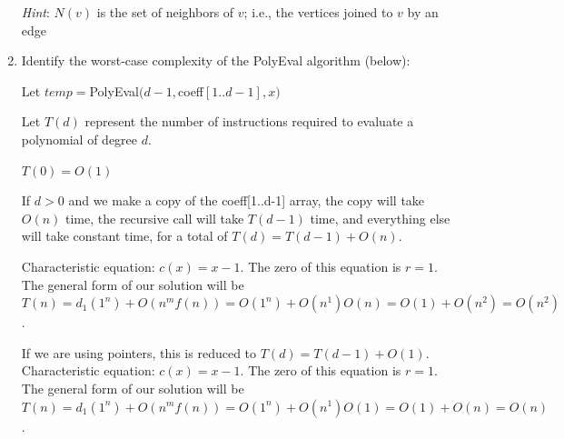 \documentclass{article}
\begin{document}
\begin{enumerate}
\textit{Hint}:  $N(v)$ is the set of neighbors of $v$; i.e., the vertices joined to $v$ by an edge



\newpage
\item Identify the worst-case complexity of the PolyEval algorithm (below):

\begin{algorithm}
{
  \;
}
{
  Let $temp = $PolyEval$(d-1, $coeff$[1..d-1], x)$\;
  \;
}
\end{algorithm}

Let $T(d)$ represent the number of instructions required to evaluate a polynomial of degree $d$.

$T(0) = O(1)$

If $d > 0$ and we make a copy of the coeff[1..d-1] array, the copy will take $O(n)$ time, the recursive call will take $T(d-1)$ time, and everything else will take constant time, for a total of $T(d) = T(d-1) + O(n)$.

Characteristic equation:  $c(x) = x - 1$.  The zero of this equation is $r = 1$.
The general form of our solution will be $T(n) = d_1(1^n) + O(n^mf(n)) = O(1^n) + O(n^1)O(n) = O(1) + O(n^2) = O(n^2)$.

If we are using pointers, this is reduced to $T(d) = T(d-1) + O(1)$.
Characteristic equation:  $c(x) = x - 1$.  The zero of this equation is $r = 1$.
The general form of our solution will be $T(n) = d_1(1^n) + O(n^mf(n)) = O(1^n) + O(n^1)O(1) = O(1) + O(n) = O(n)$.

\end{enumerate}
\end{document}
